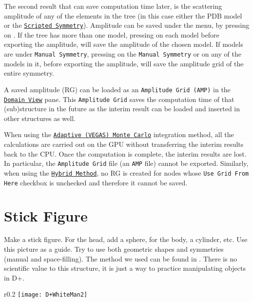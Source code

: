 \documentclass[../D+Manual.tex]{subfiles}
\begin{document}
The second result that can save computation time later, is the scattering amplitude of any of the elements in the tree (in this case either the PDB model or the \hyperref [sec:ScriptedSymmetry]{\texttt{Scripted Symmetry}}). Amplitude can be saved under the  menu, by pressing on . If the tree has more than one model, pressing on each model before exporting the amplitude, will save the amplitude of the chosen model. If models are under \texttt{Manual Symmetry}, pressing on the \texttt{Manual Symmetry} or on any of the models in it, before exporting the amplitude, will save the amplitude grid of the entire symmetry. 



A saved amplitude (RG) can be loaded as an \texttt{Amplitude Grid (AMP)} in the \hyperref[sec:domainView]{\texttt{Domain View}} pane.
This \texttt{Amplitude Grid} saves the computation time of that (sub)structure in the future as the interim result can be loaded and inserted in other structures as well.

When using the \hyperref[sec:VEGAS]{\texttt{Adaptive (VEGAS) Monte Carlo}} integration method, all the calculations are carried out on the GPU without transferring the interim results back to the CPU.
Once the computation is complete, the interim results are lost. In particular, the \texttt{Amplitude Grid} file (an \texttt{AMP} file) cannot be exported. 
Similarly, when using the \hyperref[sec:UsingHybridMethod]{\texttt{Hybrid Method}}, no RG is created for nodes whose \texttt{Use Grid From Here} checkbox is unchecked and therefore it cannot be saved.

\section{Stick Figure}
Make a stick figure. For the head, add a sphere, for the body, a cylinder, etc. Use this picture as a guide. Try to use both geometric shapes and symmetries (manual and space-filling). The method we used can be found in .
There is no scientific value to this structure, it is just a way to practice manipulating objects in D+.

\begin{wrapfigure}{r}{0.2\textwidth}
	\vspace{-20pt}
	\centering
	\texttt{[image: D+WhiteMan2]}
\end{wrapfigure}
\end{document}
